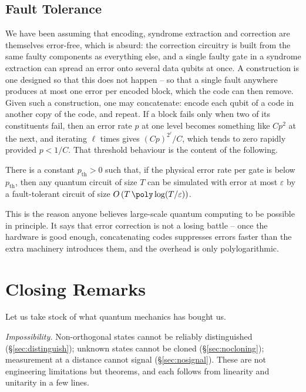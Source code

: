 \subsection{Fault Tolerance}

We have been assuming that encoding, syndrome extraction and correction are themselves error-free, which is absurd: the correction circuitry is built from the same faulty components as everything else, and a single faulty gate in a syndrome extraction can spread an error onto several data qubits at once. A  construction is one designed so that this does not happen -- so that a single fault anywhere produces at most one error per encoded block, which the code can then remove. Given such a construction, one may concatenate: encode each qubit of a code in another copy of the code, and repeat. If a block fails only when two of its constituents fail, then an error rate $p$ at one level becomes something like $Cp^2$ at the next, and iterating $\ell$ times gives $(Cp)^{2^\ell}/C$, which tends to zero rapidly provided $p<1/C$. That threshold behaviour is the content of the following.

\begin{theorem}
	There is a constant $p_{\mathrm{th}}>0$ such that, if the physical error rate per gate is below $p_{\mathrm{th}}$, then any quantum circuit of size $T$ can be simulated with error at most $\varepsilon$ by a fault-tolerant circuit of size $O\left(T\,\poly\log(T/\varepsilon)\right)$.
\end{theorem}

This is the reason anyone believes large-scale quantum computing to be possible in principle. It says that error correction is not a losing battle -- once the hardware is good enough, concatenating codes suppresses errors faster than the extra machinery introduces them, and the overhead is only polylogarithmic.

\section{Closing Remarks}

Let us take stock of what quantum mechanics has bought us.

\emph{Impossibility.} Non-orthogonal states cannot be reliably distinguished (\S\ref{sec:distinguish}); unknown states cannot be cloned (\S\ref{sec:nocloning}); measurement at a distance cannot signal (\S\ref{sec:nosignal}). These are not engineering limitations but theorems, and each follows from linearity and unitarity in a few lines.

